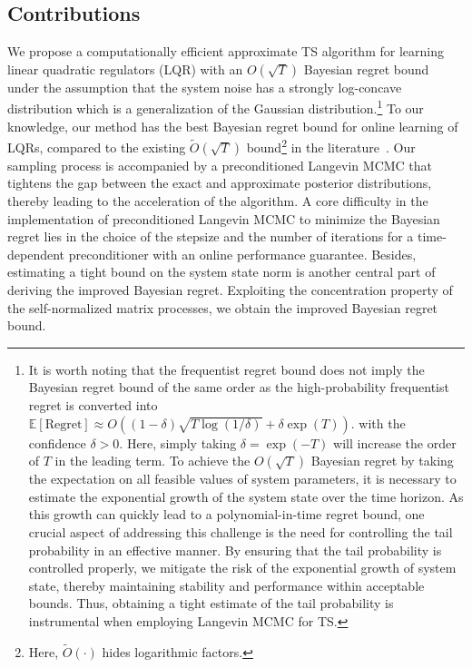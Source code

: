 \documentclass[11pt]{article}
\theoremstyle{plain}
\theoremstyle{definition}
\theoremstyle{remark}
\begin{document}
\subsection{Contributions}
We propose a computationally efficient approximate TS algorithm for learning linear quadratic regulators (LQR) with an $O(\sqrt{T})$ Bayesian regret bound under the assumption that the system noise has a strongly log-concave distribution which is a generalization of the Gaussian distribution.\footnote{It is worth noting that the frequentist regret bound does not imply the Bayesian regret bound of the same order as the high-probability frequentist regret is converted into
$\mathbb{E}[\mathrm{Regret}] \approx O  ((1-\delta)\sqrt{T \log(1/\delta)}+ \delta \exp(T) )$.
with the confidence $\delta>0$. Here,  simply taking $\delta=\exp(-T)$ will increase the order of $T$ in the leading term. To achieve the $O(\sqrt{T})$ Bayesian regret by taking the expectation on all feasible values of system parameters, it is necessary to estimate the exponential growth of the system state over the time horizon. As this growth can quickly lead to a polynomial-in-time regret bound, one crucial aspect of addressing this challenge is the need for controlling the tail probability in an effective manner. By ensuring that the tail probability is controlled properly, we mitigate the risk of the exponential growth of system state, thereby maintaining stability and performance within acceptable bounds. Thus, obtaining a tight estimate of the tail probability is instrumental when employing Langevin MCMC for TS.} 
To our knowledge, 
our method has the best Bayesian regret bound for online learning of LQRs, compared to the existing $\tilde{O}(\sqrt{T})$ bound\footnote{Here, $\tilde{O}(\cdot)$ hides logarithmic factors.} 
in the literature~\cite{abeille2018improved,ouyang2019posterior,gagrani2022modified}.
Our sampling process is accompanied by a preconditioned Langevin MCMC that tightens the gap between the exact and approximate posterior distributions, thereby leading to the acceleration of the algorithm. 
A core difficulty in the implementation of preconditioned Langevin MCMC to minimize the Bayesian regret lies in the choice of the stepsize and the number of iterations for a time-dependent preconditioner with an online performance guarantee.
Besides, estimating a tight bound on the system state norm is another central part of deriving the improved Bayesian regret.
Exploiting the concentration property of the self-normalized matrix processes, we obtain the improved Bayesian regret bound.
\end{document}
